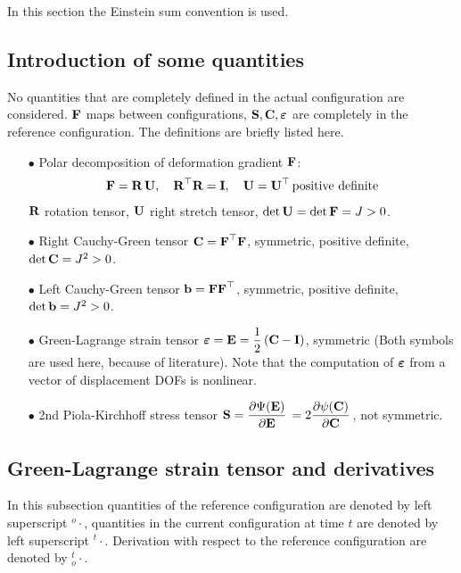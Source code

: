 In this section the Einstein sum convention is used.

\subsection{Introduction of some quantities}
No quantities that are completely defined in the actual configuration are considered. $\textbf{F}$ maps between configurations, $\textbf{S}, \textbf{C}, \boldsymbol{\varepsilon}$ are completely in the reference configuration.
The definitions are briefly listed here.
\begin{itemize}
\item[$\bullet$] Polar decomposition of deformation gradient $\textbf{F}$:
\begin{equation*}
  \begin{array}{lll}
    \textbf{F} = \textbf{R}\,\textbf{U}, \quad \textbf{R}^\top\textbf{R} = \textbf{I}, \quad \textbf{U} = \textbf{U}^\top \,\text{positive definite}
  \end{array}
\end{equation*}
$\textbf{R}$ rotation tensor, $\textbf{U}$ right stretch tensor, $\hbox{det} \, \textbf{U} = \hbox{det} \, \textbf{F} = J > 0$.
%
\item[$\bullet$] Right Cauchy-Green tensor $\textbf{C} = \textbf{F}^\top \textbf{F}$, symmetric, positive definite, $\hbox{det} \, \textbf{C} = J^2 > 0$.
\item[$\bullet$] Left Cauchy-Green tensor $\textbf{b} = \textbf{F}\textbf{F}^\top$, symmetric, positive definite, $\hbox{det} \, \textbf{b} = J^2 > 0$.
\item[$\bullet$] Green-Lagrange strain tensor $\boldsymbol{\varepsilon} = \textbf{E} =\displaystyle\frac{\displaystyle{1}}{\displaystyle{2}}\,(\textbf{C} - \textbf{I})$, symmetric (Both symbols are used here, because of literature). Note that the computation of $\boldsymbol{\varepsilon}$ from a vector of displacement DOFs is nonlinear.
\item[$\bullet$] 2nd Piola-Kirchhoff stress tensor $\bfS = \p{\Psi(\bfE)}{\bfE} = 2\p{\psi(\bfC)}{\bfC}$, not symmetric.
\end{itemize}

\subsection{Green-Lagrange strain tensor and derivatives}

In this subsection quantities of the reference configuration are denoted by left superscript ${}^o{\cdot}$, quantities in the current configuration at time $t$ are denoted by left superscript ${}^t{\cdot}$. Derivation with respect to the reference configuration are denoted by ${}^{t}_o{\cdot}$.

